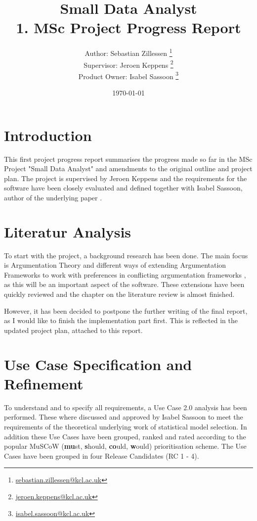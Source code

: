 \documentclass[11pt,twocolumn]{article}
\begin{document}
\title{
Small Data Analyst 
\protect\\ 
1. MSc Project Progress Report
}
\author{
Author:  \hfill Sebastian Zillessen \thanks{\href{mailto:sebastian.zillessen@kcl.ac.uk}{sebastian.zillessen@kcl.ac.uk}}\\
Supervisor: \hfill Jeroen Keppens \thanks{\href{mailto:jeroen.keppens@kcl.ac.uk}{jeroen.keppens@kcl.ac.uk}}\\
Product Owner: \hfill Isabel Sassoon \thanks{\href{mailto:isabel.sassoon@kcl.ac.uk}{isabel.sassoon@kcl.ac.uk}}
}
\date{\today}
\maketitle


\section{Introduction}
This first project progress report summarises the progress made so far in the MSc Project "Small Data Analyst" and amendments to the original outline and project plan. The project is supervised by Jeroen Keppens and the requirements for the software have been closely evaluated and defined together with Isabel Sassoon, author of the underlying paper \cite{sassoon2014}. 

\section{ Literatur Analysis}
To start with the project, a background research has been done. The main focus is Argumentation Theory \cite{dung1995} and different ways of extending Argumentation Frameworks to work with preferences in conflicting argumentation frameworks \cite{Modgil2009,amgoud,amgoud1998,pollock1987}, as this will be an important aspect of the software. These extensions have been quickly reviewed and the chapter on the literature review is almost finished.

However, it has been decided to postpone the further writing of the final report, as I would like to finish the implementation part first. This is reflected in the updated project plan, attached to this report.

\section{ Use Case Specification and Refinement}

To understand and to specify all requirements, a Use Case 2.0 \cite{jacobson2011usecase} analysis has been performed. These where discussed and approved by Isabel Sassoon to meet the requirements of the theoretical underlying work of statistical model selection. In addition these Use Cases have been grouped, ranked and rated according to the popular MuSCoW (\textbf{mu}st, \textbf{s}hould, \textbf{co}uld, \textbf{w}ould) prioritisation scheme. The Use Cases have been grouped in four Release Candidates (RC 1 - 4). 
\end{document}
